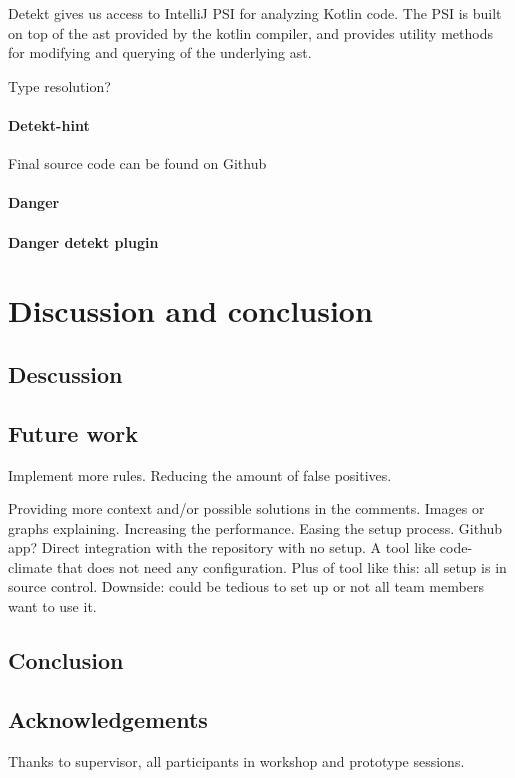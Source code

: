 \documentclass{report}
\begin{document}
Detekt gives us access to IntelliJ PSI for analyzing Kotlin code. The PSI is built on top of the \gls{ast} provided by the kotlin compiler, and provides utility methods for modifying and querying of the underlying \gls{ast}.

Type resolution?

\subsubsection{Detekt-hint}
Final source code can be found on Github\cite{detekt-hint-repository}

\subsubsection{Danger}

\subsubsection{Danger detekt plugin}

\chapter{Discussion and conclusion}
\label{discussion}

\section{Descussion}

\section{Future work}
Implement more rules.
Reducing the amount of false positives.

Providing more context and/or possible solutions in the comments. Images or graphs explaining.
Increasing the performance.
Easing the setup process. Github app? Direct integration with the repository with no setup. A tool like code-climate that does not need any configuration. Plus of tool like this: all setup is in source control. Downside: could be tedious to set up or not all team members want to use it.

\section{Conclusion}
\label{conclusion}

\section{Acknowledgements}
\label{acknowledgements}
Thanks to supervisor, all participants in workshop and prototype sessions.

\printbibliography

\appendix
\label{appendix}

\end{document}

